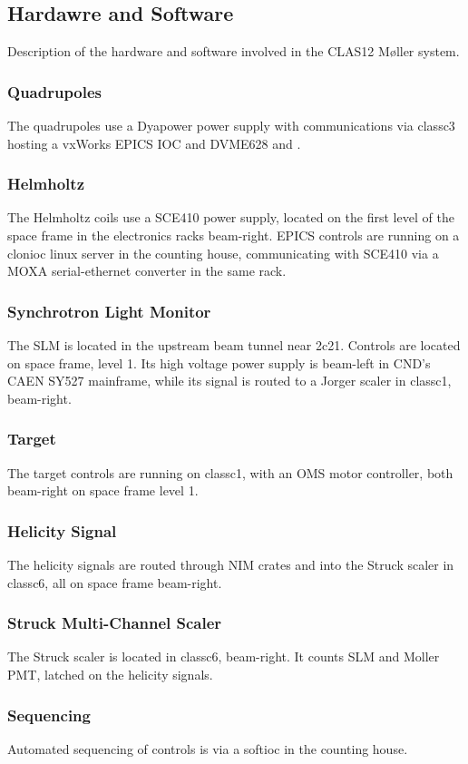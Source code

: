 \documentclass[amsmath,amssymb,notitlepage,12pt]{revtex4}
\begin{document}
\newpage

\begin{appendices}
%

\section{Hardawre and Software}
Description of the hardware and software involved in the CLAS12 M{\o}ller system.
\subsubsection{Quadrupoles}
The quadrupoles use a Dyapower power supply with communications via classc3 hosting a vxWorks EPICS IOC and DVME628 and .
\subsubsection{Helmholtz}
The Helmholtz coils use a SCE410 power supply, located on the first level of the space frame in the electronics racks beam-right.  EPICS controls are running on a clonioc linux server in the counting house, communicating with SCE410 via a MOXA serial-ethernet converter in the same rack. 
\subsubsection{Synchrotron Light Monitor}
The SLM is located in the upstream beam tunnel near 2c21.  Controls are located on space frame, level 1.  Its high voltage power supply is beam-left in CND's  CAEN SY527 mainframe, while its signal is routed to a Jorger scaler in classc1, beam-right.
\subsubsection{Target}
The target controls are running on classc1, with an OMS motor controller, both beam-right on space frame level 1.
\subsubsection{Helicity Signal}
The helicity signals are routed through NIM crates and into the Struck scaler in classc6, all on space frame beam-right. 
\subsubsection{Struck Multi-Channel Scaler}
The Struck scaler is located in classc6, beam-right.  It counts SLM and Moller PMT, latched on the helicity signals.
\subsubsection{Sequencing}
Automated sequencing of controls is via a softioc in the counting house.
\end{appendices}
\end{document}
